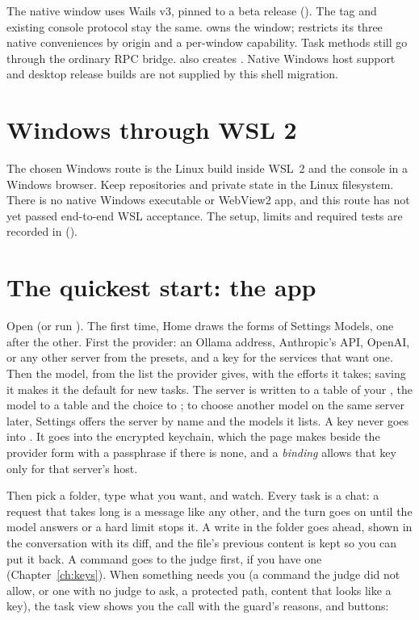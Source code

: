The native window uses Wails v3, pinned to a beta release
(). The  tag and existing console protocol stay the
same.  owns the window;
 restricts its three native conveniences
by origin and a per-window capability. Task methods still go through the
ordinary RPC bridge.  also creates
. Native Windows host support and
desktop release builds are not supplied by this shell migration.

\section{Windows through WSL 2}

The chosen Windows route is the Linux build inside WSL~2 and the console
in a Windows browser. Keep repositories and private state in the Linux
filesystem. There is no native Windows executable or WebView2 app, and
this route has not yet passed end-to-end WSL acceptance. The setup, limits
and required tests are recorded in  ().

\section{The quickest start: the app}

Open  (or run ). The first time, Home draws
the forms of Settings \textrightarrow{} Models, one after the other. First the
provider: an Ollama address, Anthropic's API, OpenAI, or any other server from
the presets, and a key for the services that want one. Then the model, from the
list the provider gives, with the efforts it takes; saving it makes it the
default for new tasks. The server is written to a 
table of your , the model to a  table
and the choice to \code{[control]}; to choose another model on the same server
later, Settings offers the server by name and the models it lists. A key never
goes into . It goes into the encrypted
keychain, which the page makes beside the provider form with a passphrase if there
is none, and a \emph{binding} allows that key only for that server's host.

Then pick a folder, type what you want, and watch. Every task is a chat:
a request that takes long is a message like any other, and the turn goes
on until the model answers or a hard limit stops it. A write in the folder goes ahead, shown in the
conversation with its diff, and the file's previous content is kept so you
can put it back. A command goes to the judge first, if you have one
(Chapter~\ref{ch:keys}). When something needs you (a command the judge did
not allow, or one with no judge to ask, a protected path, content that
looks like a key), the task view shows you the call with the guard's
reasons, and buttons:

